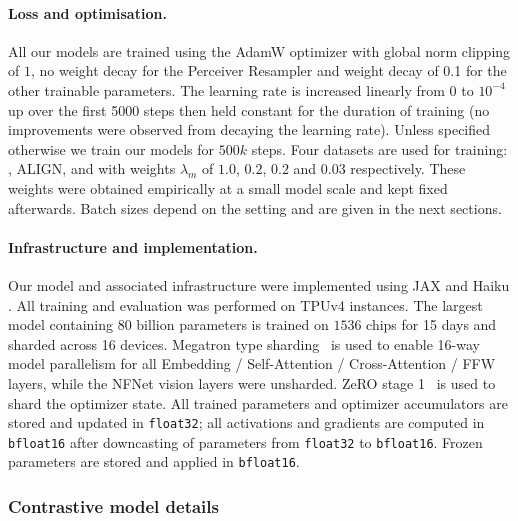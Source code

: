 \paragraph{Loss and optimisation.}
All our models are trained using the AdamW optimizer with global norm clipping of $1$, no weight decay for the Perceiver Resampler and weight decay of 0.1 for the other trainable parameters.
The learning rate is increased linearly from $0$ to $10^{-4}$ up over the first 5000 steps then held constant for the duration of training (no improvements were observed from decaying the learning rate).
Unless specified otherwise we train our models for $500k$ steps.
Four datasets are used for training: \mmmw{}, ALIGN, \shortimagetextpairs{} and \shortvideotextpairs{}  with weights $\lambda_m$ of $1.0$, $0.2$, $0.2$ and $0.03$ respectively.
These weights were obtained empirically at a small model scale and kept fixed afterwards.
Batch sizes depend on the setting and are given in the next sections.


\paragraph{Infrastructure and implementation.}
Our model and associated infrastructure were implemented using JAX \citep{jax2018github} and Haiku \citep{haiku2020github}. All training and evaluation was performed on TPUv4 instances. The largest model containing 80 billion parameters is trained on $1536$ chips for 15 days and sharded across 16 devices.
Megatron type sharding~\citep{megatron} is used to enable 16-way model parallelism for all Embedding / Self-Attention / Cross-Attention / FFW layers, while the NFNet vision layers were unsharded. ZeRO stage 1~\citep{zero} is used to shard the optimizer state. All trained parameters and optimizer accumulators are stored and updated in \texttt{float32}; all activations and gradients are computed in \texttt{bfloat16} after downcasting of parameters from \texttt{float32} to \texttt{bfloat16}. Frozen parameters are stored and applied in \texttt{bfloat16}.

\subsubsection{Contrastive model details}
\label{app:contrastive_details}

